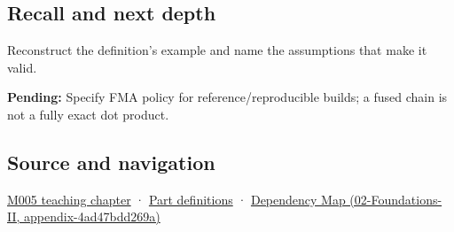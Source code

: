 \subsection{Recall and next depth}\label{recall-and-next-depth}

Reconstruct the definition's example and name the assumptions that make it valid.

\textbf{Pending:} Specify FMA policy for reference/reproducible builds; a fused chain is not a fully exact dot product.

\subsection{Source and navigation}\label{source-and-navigation}

\href{Continuous\%20Notes/Computing\%20Foundations\%20-\%20From\%20Bits\%20to\%20C++\%20and\%20Systems\%20APIs\#When\%20arithmetic\%20meets\%20uncertainty}{M005 teaching chapter} · \hyperref[appendix-fd090d982a15]{Part definitions} · \href{}{Dependency Map (02-Foundations-II, appendix-4ad47bdd269a)}
